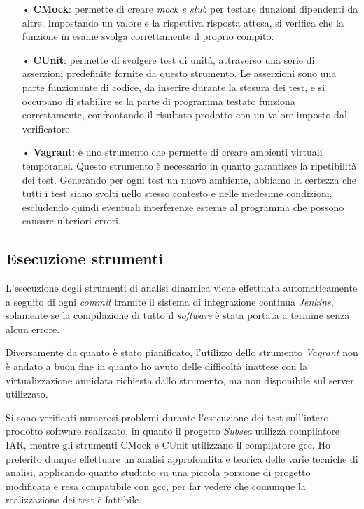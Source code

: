 \begin{itemize}
\item[•] \textbf{CMock}: permette di creare \textit{mock e stub} per testare dunzioni dipendenti da altre. Impostando un valore e la rispettiva risposta attesa, si verifica che la funzione in esame svolga correttamente il proprio compito.

\item[•] \textbf{CUnit}: permette di svolgere test di unità, attraverso una serie di asserzioni predefinite fornite da questo strumento. Le asserzioni sono una parte funzionante di codice, da inserire durante la stesura dei test, e si occupano di stabilire se la parte di programma testato funziona correttamente, confrontando il risultato prodotto con un valore imposto dal verificatore.

\item[•] \textbf{Vagrant}: è uno strumento che permette di creare ambienti virtuali temporanei. Questo strumento è necessario in quanto garantisce la ripetibilità dei test. Generando per ogni test un nuovo ambiente, abbiamo la certezza che tutti i test siano svolti nello stesso contesto e nelle medesime condizioni, escludendo quindi eventuali interferenze esterne al programma che possono causare ulteriori errori.
\end{itemize}

\subsection{Esecuzione strumenti}

L'esecuzione degli strumenti di analisi dinamica viene effettuata automaticamente a seguito di ogni \textit{commit} tramite il sistema di integrazione continua \textit{Jenkins}, solamente se la compilazione di tutto il \textit{software} è stata portata a termine senza alcun errore.

Diversamente da quanto è stato pianificato, l'utilizzo dello strumento \textit{Vagrant} non è andato a buon fine in quanto ho avuto delle difficoltà inattese con la virtualizzazione annidata richiesta dallo strumento, ma non disponibile sul server utilizzato.

Si sono verificati numerosi problemi durante l'esecuzione dei test sull'intero prodotto software realizzato, in quanto il progetto \textit{Subsea} utilizza compilatore IAR, mentre gli strumenti CMock e CUnit utilizzano il compilatore gcc. Ho preferito dunque effettuare un'analisi approfondita e teorica delle varie tecniche di analisi, applicando quanto studiato su una piccola porzione di progetto modificata e resa compatibile con gcc, per far vedere che comunque la realizzazione dei test è fattibile.

